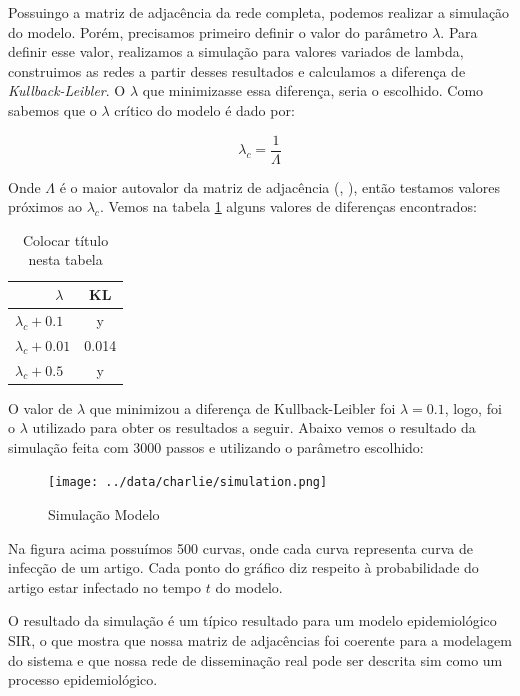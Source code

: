 \documentclass[a4paper,12pt]{article}
\begin{document}
Possuingo a matriz de adjacência da rede completa, podemos realizar a simulação do modelo. Porém, precisamos primeiro definir o valor do 
parâmetro $\lambda$. Para definir esse valor, realizamos a simulação para valores variados de lambda, construimos as redes a partir desses
resultados e calculamos a diferença de \textit{Kullback-Leibler}. O $\lambda$ que minimizasse essa diferença, seria o escolhido. Como sabemos
que o $\lambda$ crítico do modelo é dado por: 

$$\lambda_{c} = \dfrac{1}{\Lambda}$$

Onde $\Lambda$ é o maior autovalor da matriz de adjacência (\cite{wang2003proceedings}, \cite{chakrabarti2008epidemic}), então testamos
valores próximos ao $\lambda_{c}$. Vemos na tabela \ref{tabela:dist_kl} alguns valores de diferenças encontrados:

\begin{table}
\caption{Colocar t\'itulo nesta tabela}
\label{tabela:dist_kl}
 \begin{center}
 \begin{tabular}{l|c}
   \ \ \ \ \ $\lambda$ & KL \\ \hline
   $\lambda_{c} + 0.1$ & y\\
   $\lambda_{c} + 0.01$ & 0.014 \\
   $\lambda_{c} + 0.5$ & y
 \end{tabular}
\end{center}
\end{table}



O valor de $\lambda$ que minimizou a diferença de Kullback-Leibler foi $\lambda=0.1$, logo, foi o $\lambda$ utilizado para obter os
resultados a seguir. Abaixo vemos o resultado da simulação feita com 3000 passos e utilizando o parâmetro escolhido:

\begin{figure}[ht]
 \centering
 \texttt{[image: ../data/charlie/simulation.png]}
 \caption{Simulação Modelo}
\end{figure}

Na figura acima possuímos 500 curvas, onde cada curva representa curva de infecção de um artigo. Cada ponto do gráfico diz
respeito à probabilidade do artigo estar infectado no tempo $t$ do modelo. 

O resultado da simulação é um típico resultado para um modelo epidemiológico SIR, o que mostra que nossa matriz de adjacências foi coerente
para a modelagem do sistema e que nossa rede de disseminação real pode ser descrita sim como um processo epidemiológico.
\end{document}
